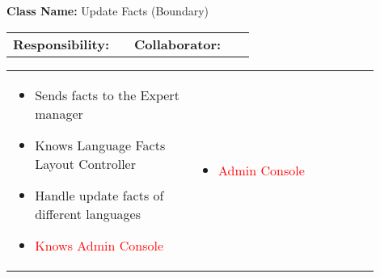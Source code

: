 \begin{cards}[]
    \textbf{Class Name:} Update Facts (Boundary)
    \tcbline
    \begin{tabular}{p{0.45\linewidth} | p{0.45\linewidth}}
        \textbf{Responsibility:}& 
        \textbf{Collaborator:}\\
    \end{tabular}
    \tcbline
    \begin{tabular}{p{0.45\linewidth} | p{0.45\linewidth}}
        \begin{itemize}
            \item Sends facts to the Expert manager
            \item Knows Language Facts Layout Controller
            \item Handle update facts of different languages
            \item \textcolor{red}{Knows Admin Console}
        \end{itemize}
        &
        \begin{itemize}
            \item \textcolor{red}{Admin Console}
        \end{itemize}
    \end{tabular}
\end{cards}